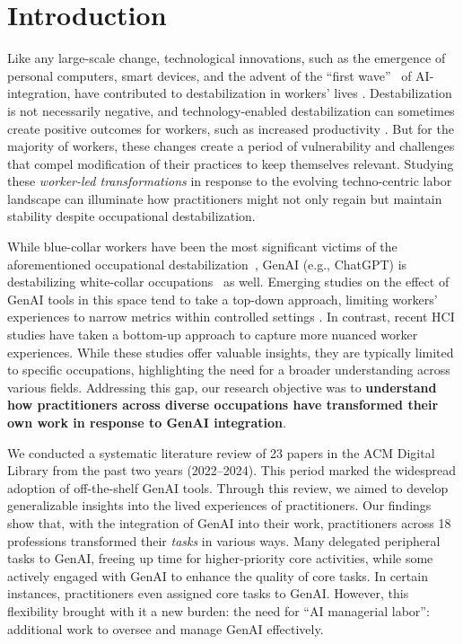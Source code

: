 
\section{Introduction}
Like any large-scale change, technological innovations, such as the emergence of personal computers, smart devices, and the advent of the ``first wave''~\cite{Autor2023} of AI-integration, have contributed to destabilization in workers' lives \cite{Anteby_2016}. Destabilization is not necessarily negative, and technology-enabled destabilization can sometimes create positive outcomes for workers, such as increased productivity \cite{Brynjolfsson2023}. But for the majority of workers, these changes create a period of vulnerability and challenges that compel modification of their practices to keep themselves relevant. Studying these \textit{worker-led transformations} in response to the evolving techno-centric labor landscape can illuminate how practitioners might not only regain but maintain stability despite occupational destabilization. 

While blue-collar workers have been the most significant victims of the aforementioned occupational destabilization~\cite{Ford_2015},  GenAI (e.g., ChatGPT) is destabilizing white-collar occupations~\cite{Felten2023} as well.
Emerging studies on the effect of GenAI tools in this space tend to take a top-down approach, limiting workers' experiences to narrow metrics within controlled settings \cite{Brynjolfsson2023}. In contrast, recent HCI studies have taken a bottom-up approach to capture more nuanced worker experiences. While these studies offer valuable insights, they are typically limited to specific occupations, highlighting the need for a broader understanding across various fields. Addressing this gap, our research objective was to \textbf{understand how practitioners across diverse occupations have transformed their own work in response to GenAI integration}. 

We conducted a systematic literature review of 23 papers in the ACM Digital Library from the past two years (2022–2024). This period marked the widespread adoption of off-the-shelf GenAI tools. Through this review, we aimed to develop generalizable insights into the lived experiences of practitioners.
Our findings show that, with the integration of GenAI into their work, practitioners across 18 professions transformed their \textit{tasks} in various ways. Many delegated peripheral tasks to GenAI, freeing up time for higher-priority core activities, while some actively engaged with GenAI to enhance the quality of core tasks. In certain instances, practitioners even assigned core tasks to GenAI. However, this flexibility brought with it a new burden: the need for ``AI managerial labor'': additional work to oversee and manage GenAI effectively.

